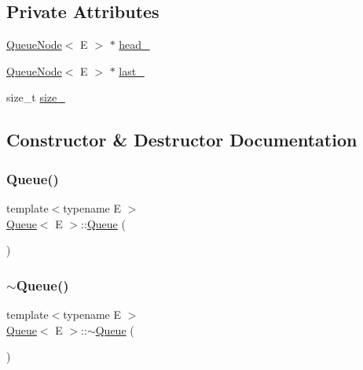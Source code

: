 \subsection*{Private Attributes}
\begin{DoxyCompactItemize}
\item 
\hyperlink{classQueueNode}{Queue\+Node}$<$ E $>$ $\ast$ \hyperlink{classQueue_abf9219bcea800d26e8bfdb4777d98729}{head\+\_\+}
\item 
\hyperlink{classQueueNode}{Queue\+Node}$<$ E $>$ $\ast$ \hyperlink{classQueue_a7466dca4f96147c9124af582ab170df0}{last\+\_\+}
\item 
size\+\_\+t \hyperlink{classQueue_a7ac3c0717d894e1aecc56f4ddb35c7ea}{size\+\_\+}
\end{DoxyCompactItemize}


\subsection{Constructor \& Destructor Documentation}
\mbox{\label{classQueue_ab09891e54b51dc677ee6efb350687ae4}} 
\subsubsection{\texorpdfstring{Queue()}{Queue()}\hspace{0.1cm}{\footnotesize\ttfamily [1/2]}}
{\footnotesize\ttfamily template$<$typename E $>$ \\
\hyperlink{classQueue}{Queue}$<$ E $>$\+::\hyperlink{classQueue}{Queue} (\begin{DoxyParamCaption}{ }\end{DoxyParamCaption})\hspace{0.3cm}{\ttfamily [inline]}}

\mbox{\label{classQueue_a49fe82adb8dc2fb62ab53876a6933d0f}} 
\subsubsection{\texorpdfstring{$\sim$\+Queue()}{~Queue()}}
{\footnotesize\ttfamily template$<$typename E $>$ \\
\hyperlink{classQueue}{Queue}$<$ E $>$\+::$\sim$\hyperlink{classQueue}{Queue} (\begin{DoxyParamCaption}{ }\end{DoxyParamCaption})\hspace{0.3cm}{\ttfamily [inline]}}

